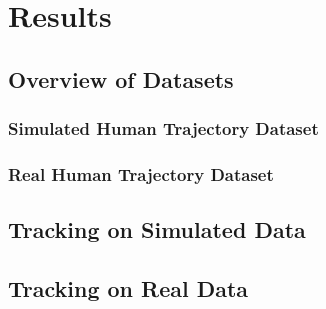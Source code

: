 \chapter{Results}

\section{Overview of Datasets}

\subsection{Simulated Human Trajectory Dataset}

\subsection{Real Human Trajectory Dataset}

\section{Tracking on Simulated Data}

\section{Tracking on Real Data}
 